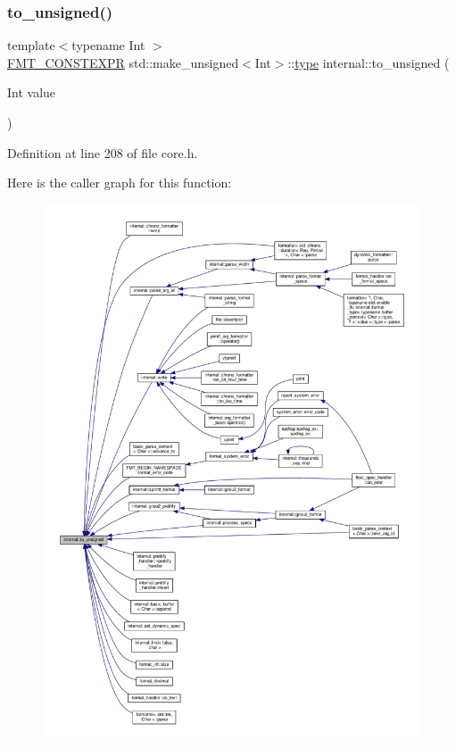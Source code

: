 \subsubsection{\texorpdfstring{to\+\_\+unsigned()}{to\_unsigned()}}
{\footnotesize\ttfamily template$<$typename Int $>$ \\
\hyperlink{core_8h_a69201cb276383873487bf68b4ef8b4cd}{F\+M\+T\+\_\+\+C\+O\+N\+S\+T\+E\+X\+PR} std\+::make\+\_\+unsigned$<$Int$>$\+::\hyperlink{namespaceinternal_a8661864098ac0acff9a6dd7e66f59038}{type} internal\+::to\+\_\+unsigned (\begin{DoxyParamCaption}\item[{Int}]{value }\end{DoxyParamCaption})}



Definition at line 208 of file core.\+h.

Here is the caller graph for this function\+:
\nopagebreak
\begin{figure}[H]
\begin{center}
\leavevmode
\includegraphics[width=350pt]{namespaceinternal_acc608c40c33952a5382db8aaaddfc854_icgraph}
\end{center}
\end{figure}
\mbox{\label{namespaceinternal_a1904f9fcad1333e8658da7816f8df368}} 
